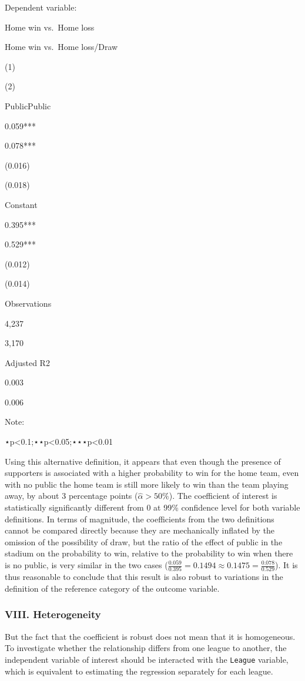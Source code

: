 \documentclass[
]{article}
\begin{document}
Dependent variable:

Home win vs.~Home loss

Home win vs.~Home loss/Draw

(1)

(2)

PublicPublic

0.059***

0.078***

(0.016)

(0.018)

Constant

0.395***

0.529***

(0.012)

(0.014)

Observations

4,237

3,170

Adjusted R2

0.003

0.006

Note:

⋆p\textless0.1;⋆⋆p\textless0.05;⋆⋆⋆p\textless0.01

Using this alternative definition, it appears that even though the
presence of supporters is associated with a higher probability to win
for the home team, even with no public the home team is still more
likely to win than the team playing away, by about 3 percentage points
(\(\hat{\alpha}>50\%\)). The coefficient of interest is statistically
significantly different from 0 at 99\% confidence level for both
variable definitions. In terms of magnitude, the coefficients from the
two definitions cannot be compared directly because they are
mechanically inflated by the omission of the possibility of draw, but
the ratio of the effect of public in the stadium on the probability to
win, relative to the probability to win when there is no public, is very
similar in the two cases
(\(\frac{0.059}{0.395}\)\(=\)\(0.1494\)\(\approx\)\(0.1475\)\(=\)\(\frac{0.078}{0.529}\)).
It is thus reasonable to conclude that this result is also robust to
variations in the definition of the reference category of the outcome
variable.

\hypertarget{viii.-heterogeneity}{%
\subsubsection{VIII. Heterogeneity}\label{viii.-heterogeneity}}

But the fact that the coefficient is robust does not mean that it is
homogeneous. To investigate whether the relationship differs from one
league to another, the independent variable of interest should be
interacted with the \texttt{League} variable, which is equivalent to
estimating the regression separately for each league.
\end{document}
